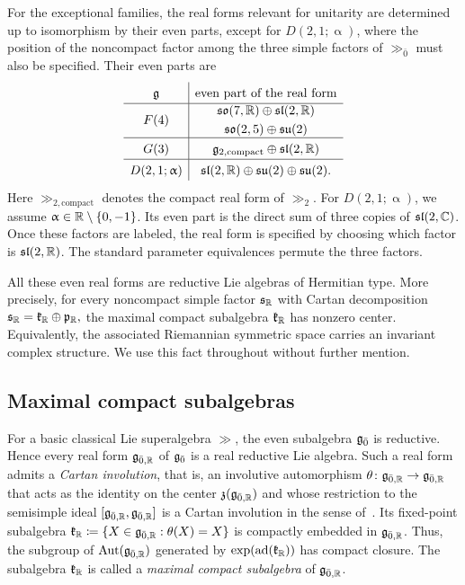 For the exceptional families, the real forms relevant for unitarity are determined up to isomorphism by their even parts, except for $D(2,1;\upalpha)$, where the position of the noncompact factor among the three simple factors of $\gg_{\bar0}$ must also be specified. Their even parts are
\begin{equation}\label{table::real_forms_exceptional}
\renewcommand{\arraystretch}{1.4}
\begin{array}{c|c}
    \gg  
    & \text{even part of the real form}\\ \hline
    F(4)
    & \begin{gathered}
        \so(7,\RR)\oplus\sl(2,\RR)
        \\
        \so(2,5)\oplus\su(2)
    \end{gathered}\\ \hline
    G(3)
    & \gg_{2,\mathrm{compact}}\oplus\sl(2,\RR)
      \\ \hline
    D(2,1;\upalpha)
    & \sl(2,\RR)\oplus
      \su(2)\oplus\su(2).
\end{array}
\end{equation}
Here $\gg_{2,\mathrm{compact}}$ denotes the compact real form of $\gg_2$. For $D(2,1;\upalpha)$, we assume $\upalpha\in\RR\setminus\{0,-1\}$. Its even part is the direct sum of three copies of $\sl(2,\mathbb C)$. Once these factors are labeled, the real form is specified by choosing which factor is $\sl(2,\RR)$. The standard parameter equivalences permute the three factors.

All these even real forms are reductive Lie algebras of Hermitian type. More precisely, for every noncompact simple factor $\mathfrak{s}_{\RR}$ with Cartan decomposition
$
\mathfrak{s}_{\RR}=\kk_{\RR}\oplus\mathfrak{p}_{\RR},
$
the maximal compact subalgebra $\kk_{\RR}$ has nonzero center. Equivalently, the associated Riemannian symmetric space carries an invariant complex structure. We use this fact throughout without further mention.

\subsection{Maximal compact subalgebras}\label{subsec::maximal_compact_subalgebra}

For a basic classical Lie superalgebra $\gg$, the even subalgebra $\even$ is reductive. Hence every real form $\gg_{\bar0,\RR}$ of $\even$ is a real reductive Lie algebra. Such a real form admits a \emph{Cartan involution}, that is, an involutive automorphism
$
\theta\colon\gg_{\bar0,\RR}\to\gg_{\bar0,\RR}
$
that acts as the identity on the center $\mathfrak{z}(\gg_{\bar0,\RR})$ and whose restriction to the semisimple ideal $[\gg_{\bar0,\RR},\gg_{\bar0,\RR}]$ is a Cartan involution in the sense of~\cite[Chapter~VI]{Knapp}. Its fixed-point subalgebra
$
\kk_{\RR}\coloneqq\{X\in\gg_{\bar0,\RR}:\theta(X)=X\}
$
is compactly embedded in $\gg_{\bar0,\RR}$. Thus, the subgroup of $\operatorname{Aut}(\gg_{\bar0,\RR})$ generated by $\exp(\ad(\kk_{\RR}))$ has compact closure. The subalgebra $\kk_{\RR}$ is called a \emph{maximal compact subalgebra} of $\gg_{\bar0,\RR}$.

